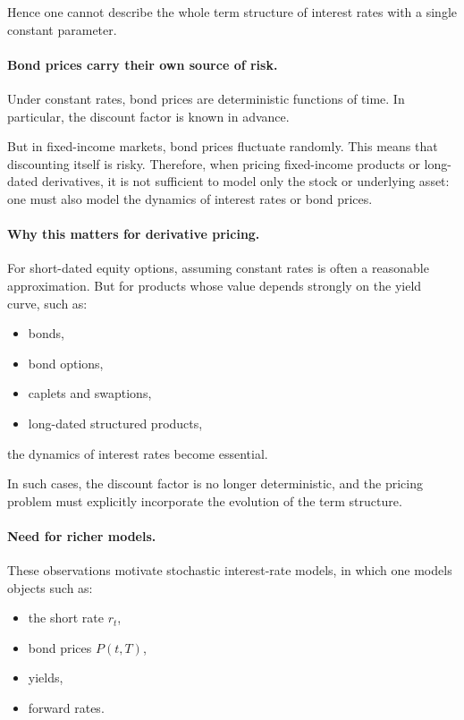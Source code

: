 \documentclass[11pt]{article}
\theoremstyle{plain}
\theoremstyle{definition}
\theoremstyle{remark}
\begin{document}
Hence one cannot describe the whole term structure of interest rates
with a single constant parameter.

\paragraph{Bond prices carry their own source of risk.}

Under constant rates, bond prices are deterministic functions of time.
In particular, the discount factor is known in advance.

But in fixed-income markets, bond prices fluctuate randomly.
This means that discounting itself is risky.
Therefore, when pricing fixed-income products or long-dated derivatives,
it is not sufficient to model only the stock or underlying asset: one
must also model the dynamics of interest rates or bond prices.

\paragraph{Why this matters for derivative pricing.}

For short-dated equity options, assuming constant rates is often a
reasonable approximation.
But for products whose value depends strongly on the yield curve, such
as:
\begin{itemize}[leftmargin=1.4em]
    \item bonds,
    \item bond options,
    \item caplets and swaptions,
    \item long-dated structured products,
\end{itemize}
the dynamics of interest rates become essential.

In such cases, the discount factor is no longer deterministic, and the
pricing problem must explicitly incorporate the evolution of the term
structure.

\paragraph{Need for richer models.}

These observations motivate stochastic interest-rate models, in which
one models objects such as:
\begin{itemize}[leftmargin=1.4em]
    \item the short rate \(r_t\),
    \item bond prices \(P(t,T)\),
    \item yields,
    \item forward rates.
\end{itemize}
\end{document}
